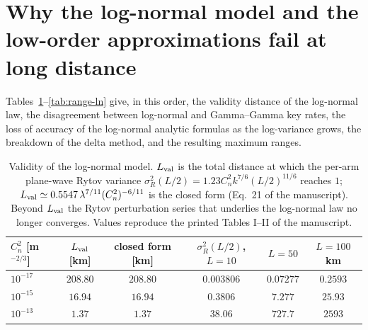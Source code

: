 \documentclass[11pt,a4paper]{article}
\theoremstyle{plain}
\theoremstyle{remark}
\begin{document}
\section{Why the log-normal model and the low-order approximations fail at long distance}
\label{sec:fail}
Tables~\ref{tab:val}--\ref{tab:range-ln} give, in this order, the validity distance of the log-normal law, the disagreement between log-normal and Gamma--Gamma key rates, the loss of accuracy of the log-normal analytic formulas as the log-variance grows, the breakdown of the delta method, and the resulting maximum ranges.
\begin{table}[htbp]
\centering\small
\caption{Validity of the log-normal model. $L_{\rm val}$ is the total distance at which the per-arm plane-wave Rytov variance $\sigma_R^2(L/2)=1.23C_n^2k^{7/6}(L/2)^{11/6}$ reaches $1$; $L_{\rm val}\simeq0.5547\,\lambda^{7/11}(C_n^2)^{-6/11}$ is the closed form (Eq.~21 of the manuscript). Beyond $L_{\rm val}$ the Rytov perturbation series that underlies the log-normal law no longer converges. Values reproduce the printed Tables I--II of the manuscript.}
\label{tab:val}
\begin{tabular}{lccccc}
\toprule
$C_n^2$ [m$^{-2/3}$] & $L_{\rm val}$ [km] & closed form [km] & $\sigma_R^2(L/2)$, $L{=}10$ & $L{=}50$ & $L{=}100$ km\\
\midrule
$10^{-17}$ & $208.80$ & $208.80$ & $0.003806$ & $0.07277$ & $0.2593$ \\
$10^{-15}$ & $16.94$ & $16.94$ & $0.3806$ & $7.277$ & $25.93$ \\
$10^{-13}$ & $1.37$ & $1.37$ & $38.06$ & $727.7$ & $2593$ \\

\bottomrule
\end{tabular}
\end{table}
\end{document}
